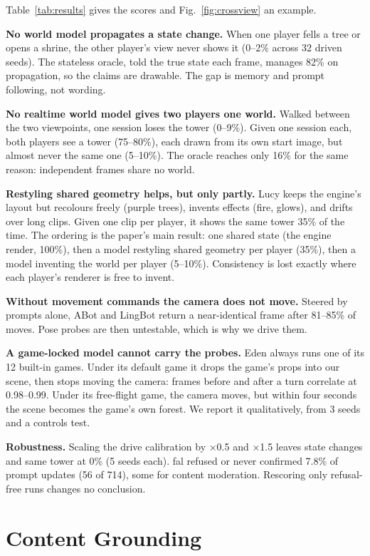 \documentclass[conference]{IEEEtran}
\begin{document}
Table~\ref{tab:results} gives the scores and Fig.~\ref{fig:crossview} an example.

\textbf{No world model propagates a state change.} When one player fells a tree or opens a shrine, the other player's view never shows it (0--2\% across 32 driven seeds). The stateless oracle, told the true state each frame, manages 82\% on propagation, so the claims are drawable. The gap is memory and prompt following, not wording.

\textbf{No realtime world model gives two players one world.} Walked between the two viewpoints, one session loses the tower (0--9\%). Given one session each, both players see a tower (75--80\%), each drawn from its own start image, but almost never the same one (5--10\%). The oracle reaches only 16\% for the same reason: independent frames share no world.

\textbf{Restyling shared geometry helps, but only partly.} Lucy keeps the engine's layout but recolours freely (purple trees), invents effects (fire, glows), and drifts over long clips. Given one clip per player, it shows the same tower 35\% of the time. The ordering is the paper's main result: one shared state (the engine render, 100\%), then a model restyling shared geometry per player (35\%), then a model inventing the world per player (5--10\%). Consistency is lost exactly where each player's renderer is free to invent.

\textbf{Without movement commands the camera does not move.} Steered by prompts alone, ABot and LingBot return a near-identical frame after 81--85\% of moves. Pose probes are then untestable, which is why we drive them.

\textbf{A game-locked model cannot carry the probes.} Eden always runs one of its 12 built-in games. Under its default game it drops the game's props into our scene, then stops moving the camera: frames before and after a turn correlate at 0.98--0.99. Under its free-flight game, the camera moves, but within four seconds the scene becomes the game's own forest. We report it qualitatively, from 3 seeds and a controls test.

\textbf{Robustness.} Scaling the drive calibration by $\times$0.5 and $\times$1.5 leaves state changes and same tower at 0\% (5 seeds each). fal refused or never confirmed 7.8\% of prompt updates (56 of 714), some for content moderation. Rescoring only refusal-free runs changes no conclusion.

\section{Content Grounding}\label{sec:grounding}
\end{document}

